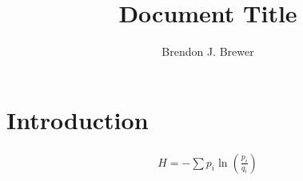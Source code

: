 \documentclass[a4paper, 11pt]{article}
\title{Document Title}
\author{Brendon J. Brewer}
\begin{document}
\maketitle

\section{Introduction}

\begin{eqnarray}
H = -\sum p_i \ln\left(\frac{p_i}{q_i}\right)
\end{eqnarray}
\end{document}
